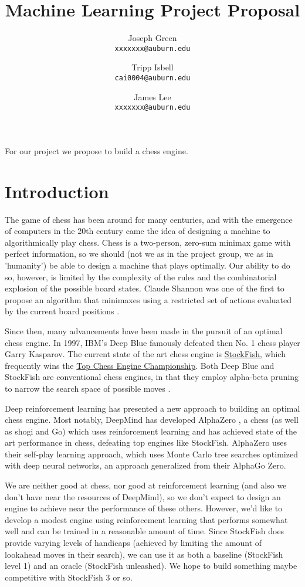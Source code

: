 \documentclass[notitlepage, 12pt]{article}
\title{Machine Learning Project Proposal}
\author{
  Joseph Green\\
  \texttt{xxxxxxx@auburn.edu}
  \and
  Tripp Isbell\\
  \texttt{cai0004@auburn.edu}
  \and
  James Lee\\
  \texttt{xxxxxxx@auburn.edu}
}
\date{}
\begin{document}
\maketitle
For our project we propose to build a chess engine.
\section*{Introduction}
The game of chess has been around for many centuries, and with the emergence of computers in the 20th century came the idea of designing a machine to algorithmically play chess. Chess is a two-person, zero-sum minimax game \cite{vonneumann} with perfect information, so we should (not we as in the project group, we as in 'humanity') be able to design a machine that plays optimally. Our ability to do so, however, is limited by the complexity of the rules and the combinatorial explosion of the possible board states. Claude Shannon was one of the first to propose an algorithm that minimaxes using a restricted set of actions evaluated by the current board positions \cite{shannon}. 

Since then, many advancements have been made in the pursuit of an optimal chess engine. In 1997, IBM's Deep Blue famously defeated then No. 1 chess player Garry Kasparov. The current state of the art chess engine is \href{https://stockfishchess.org/}{StockFish}, which frequently wins the \href{https://en.wikipedia.org/wiki/Top_Chess_Engine_Championship}{Top Chess Engine Championship}. Both Deep Blue and StockFish are conventional chess engines, in that they employ alpha-beta pruning to narrow the search space of possible moves \cite{alphabeta}. 

Deep reinforcement learning has presented a new approach to building an optimal chess engine. Most notably, DeepMind has developed AlphaZero \cite{alphazero}, a chess (as well as shogi and Go) which uses reinforcement learning and has achieved state of the art performance in chess, defeating top engines like StockFish. AlphaZero uses their self-play learning approach, which uses Monte Carlo tree searches optimized with deep neural networks, an approach generalized from their AlphaGo Zero\cite{alphagozero}.

We are neither good at chess, nor good at reinforcement learning (and also we don't have near the resources of DeepMind), so we don't expect to design an engine to achieve near the performance of these others. However, we'd like to develop a modest engine using reinforcement learning that performs somewhat well and can be trained in a reasonable amount of time. Since StockFish does provide varying levels of handicaps (achieved by limiting the amount of lookahead moves in their search), we can use it as both a baseline (StockFish level 1) and an oracle (StockFish unleashed). We hope to build something maybe competitive with StockFish 3 or so.

\end{document}

